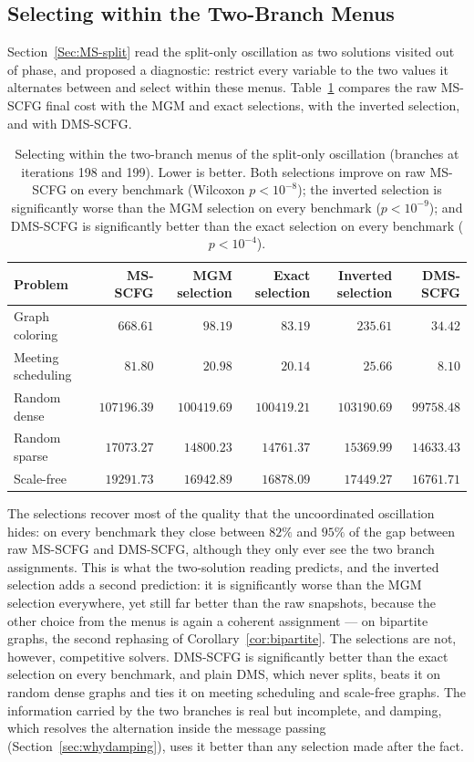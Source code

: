 \subsection{Selecting within the Two-Branch Menus}
Section~\ref{Sec:MS-split} read the split-only oscillation as two
solutions visited out of phase, and proposed a diagnostic: restrict every
variable to the two values it alternates between and select within these
menus.  Table~\ref{tab:merge} compares the raw MS-SCFG final cost with the
MGM and exact selections, with the inverted selection, and with DMS-SCFG.
\begin{table}[t]
\centering
\caption{Selecting within the two-branch menus of the split-only
oscillation (branches at iterations 198 and 199).  Lower is better.  Both
selections improve on raw MS-SCFG on every benchmark (Wilcoxon
$p < 10^{-8}$); the inverted selection is significantly worse than the MGM
selection on every benchmark ($p < 10^{-9}$); and DMS-SCFG is significantly
better than the exact selection on every benchmark ($p < 10^{-4}$).}
\label{tab:merge}
\begin{tabular}{lrrrrr}
\toprule
\textbf{Problem}
& \textbf{MS-SCFG}
& \textbf{MGM selection}
& \textbf{Exact selection}
& \textbf{Inverted selection}
& \textbf{DMS-SCFG} \\
\midrule
Graph coloring
& $668.61$ & $98.19$ & $83.19$ & $235.61$ & $34.42$ \\
Meeting scheduling
& $81.80$ & $20.98$ & $20.14$ & $25.66$ & $8.10$ \\
Random dense
& $107196.39$ & $100419.69$ & $100419.21$ & $103190.69$ & $99758.48$ \\
Random sparse
& $17073.27$ & $14800.23$ & $14761.37$ & $15369.99$ & $14633.43$ \\
Scale-free
& $19291.73$ & $16942.89$ & $16878.09$ & $17449.27$ & $16761.71$ \\
\bottomrule
\end{tabular}
\end{table}
The selections recover most of the quality that the uncoordinated
oscillation hides: on every benchmark they close between $82\%$ and
$95\%$ of the gap between raw MS-SCFG and DMS-SCFG, although they only
ever see the two branch assignments.  This is what the two-solution
reading predicts, and the inverted selection adds a second prediction: it
is significantly worse than the MGM selection everywhere, yet still far
better than the raw snapshots, because the other choice from the menus is
again a coherent assignment --- on bipartite graphs, the second rephasing
of Corollary~\ref{cor:bipartite}.  The selections are not, however,
competitive solvers.  DMS-SCFG is significantly better than the exact
selection on every benchmark, and plain DMS, which never splits, beats it
on random dense graphs and ties it on meeting scheduling and scale-free
graphs.  The information carried by the two branches
is real but incomplete, and damping, which resolves the alternation inside
the message passing (Section~\ref{sec:whydamping}), uses it better than any
selection made after the fact.
